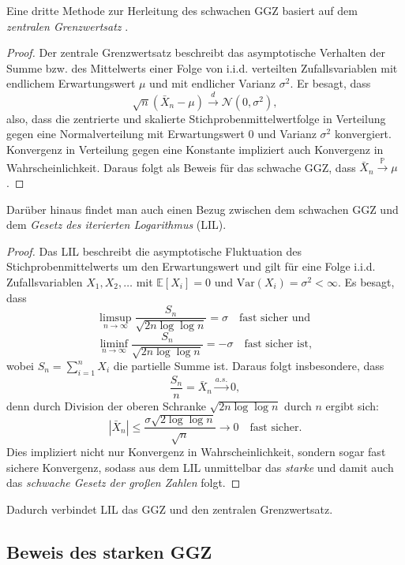 \documentclass[aodsor,preprint]{imsart}
\numberwithin{equation}{section}
\theoremstyle{plain}
\begin{document}
Eine dritte Methode zur Herleitung des schwachen GGZ basiert auf dem \textit{zentralen Grenzwertsatz} \citep{walz2001}.

\begin{proof}
Der zentrale Grenzwertsatz beschreibt das asymptotische Verhalten der Summe bzw. des Mittelwerts einer Folge von i.i.d. verteilten Zufallsvariablen mit endlichem Erwartungswert \( \mu \) und mit endlicher Varianz \( \sigma^2 \). Er besagt, dass
\[
\sqrt{n} \left( \bar{X}_n - \mu \right) \xrightarrow{d} \mathcal{N}(0, \sigma^2),
\]
also, dass die zentrierte und skalierte Stichprobenmittelwertfolge in Verteilung gegen eine Normalverteilung mit Erwartungswert 0 und Varianz \( \sigma^2 \) konvergiert. Konvergenz in Verteilung gegen eine Konstante impliziert auch Konvergenz in Wahrscheinlichkeit. Daraus folgt als Beweis für das schwache GGZ, dass \( \bar{X}_n \xrightarrow{\mathbb{P}} \mu \) \citep{degroot2021}.
\end{proof}


Darüber hinaus findet man auch einen Bezug zwischen dem schwachen GGZ und dem \textit{Gesetz des iterierten Logarithmus} (LIL).

\begin{proof}
Das LIL beschreibt die asymptotische Fluktuation des Stichprobenmittelwerts um den Erwartungswert und gilt für eine Folge i.i.d. Zufallsvariablen \( X_1, X_2, \dots \) mit \( \mathbb{E}[X_i] = 0 \) und \( \text{Var}(X_i) = \sigma^2 < \infty \). Es besagt, dass
\[
\limsup_{n \to \infty} \frac{S_n}{\sqrt{2n \log \log n}} = \sigma \quad \text{fast sicher und }
\]
\[
\liminf_{n \to \infty} \frac{S_n}{\sqrt{2n \log \log n}} = -\sigma \quad \text{fast sicher ist},
\]
wobei \( S_n = \sum_{i=1}^n X_i \) die partielle Summe ist. Daraus folgt insbesondere, dass
\[
\frac{S_n}{n} = \bar{X}_n \xrightarrow{a.s.} 0,
\]
denn durch Division der oberen Schranke \( \sqrt{2n \log \log n} \) durch \( n \) ergibt sich:
\[
\left| \bar{X}_n \right| \leq \frac{\sigma \sqrt{2 \log \log n}}{\sqrt{n}} \to 0 \quad \text{fast sicher}.
\]
Dies impliziert nicht nur Konvergenz in Wahrscheinlichkeit, sondern sogar fast sichere Konvergenz, sodass aus dem LIL unmittelbar das \textit{starke} und damit auch das \textit{schwache Gesetz der großen Zahlen} folgt.
\end{proof}
Dadurch verbindet LIL das GGZ und den zentralen Grenzwertsatz.


\subsection{Beweis des starken GGZ}
\label{sec:beweisstark}
\end{document}
